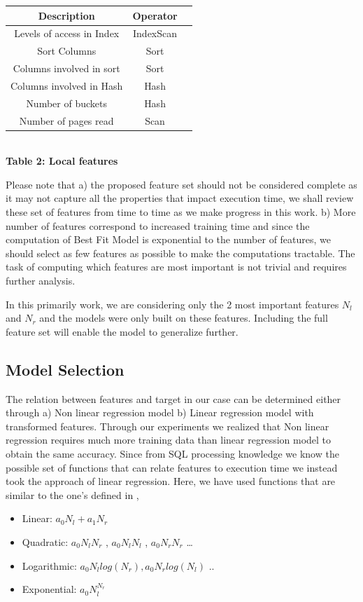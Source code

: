 \documentclass{article}
\begin{document}
\begin{multicols}{2}
	
	\begin{center}
	\begin{tabular}{|c|c|c|} 
	\hline
	  Description & Operator\\ \hline
	  Levels of access in Index & IndexScan\\  \hline
	  Sort Columns & Sort\\  \hline
	  Columns involved in sort & Sort\\  \hline
	  Columns involved in Hash & Hash\\  \hline
	  Number of buckets & Hash\\  \hline
	  Number of pages read & Scan\\  \hline
	\end{tabular}
	\\
	\vspace{.5cm}
	\textbf{Table 2: Local features}
	\end{center}
	
	Please note that a) the proposed feature set should not be considered complete as it may not capture all the properties that impact execution time, we shall review these set of features from time to time as we make progress in this work.  b) More number of features 	correspond to increased training time and since the computation of Best Fit Model is exponential to the number of features, we should select as few features as possible to make the computations tractable. The task of computing which features are most important is not trivial and requires further analysis.
	
	In this primarily work, we are considering only the 2 most important features $N_{l}$ and $N_{r}$ and the models were only built on these features. Including the full feature set will enable the model to generalize further.
	
	\subsection{Model Selection}
	The relation between features and target in our case can be determined either through a) Non linear regression model b) Linear regression model with transformed features. Through our experiments we realized that Non linear regression requires much more training data than linear regression model to obtain the same accuracy. Since from SQL processing knowledge we know the possible set of functions that can relate features to execution time we instead took the approach of linear regression. Here, we have used functions that are similar to the one's defined in \cite{robustIISc}, 
	\begin{itemize}
	\item Linear: $a_{0} N_{l} + a_{1} N_{r}$ 
	\item Quadratic: $a_{0} N_{l}N_{r}$ , $a_{0} N_{l}N_{l}$ , $a_{0} N_{r}N_{r}$ \ldots
	\item Logarithmic: $a_{0} N_{l} log(N_{r}) , a_{0} N_{r} log(N_{l}) $ .. 
	\item Exponential: $a_{0} N_{l} ^ {N_{r}}$  	
	\end{itemize}	
	

\end{multicols}
\end{document}
